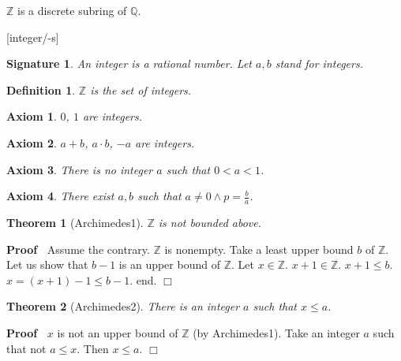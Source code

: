 \documentclass{article}
\newenvironment{forthel}{\begin{leftbar}}{\end{leftbar}}
\newenvironment{proof}{\noindent\textbf{Proof\ }}{\hspace*{\fill}$\Box$\medskip}
\newtheorem{axiom}{Axiom}
\newtheorem{theorem}{Theorem}
\newtheorem{definition}{Definition}
\newtheorem{signature}{Signature}
\newcommand{\QQ}{\mathbb{Q}}
\newcommand{\ZZ}{\mathbb{Z}}
\begin{document}
$\ZZ$ is a discrete subring of $\QQ$.

\begin{forthel}

[integer/-s]

\begin{signature} An \emph{integer} is a rational number.
Let $a,b$ stand for integers.\end{signature}

\begin{definition} $\ZZ$ is the set of integers.\end{definition}


\begin{axiom} $0$, $1$ are integers.
\end{axiom}

\begin{axiom} $a + b$, $a \cdot b$, $-a$ are integers.
\end{axiom}

\begin{axiom} There is no integer $a$ such that $0 < a < 1$.
\end{axiom}

\begin{axiom} There exist $a,b$ such that 
$a \neq 0 \wedge p = \frac{b}{a}$.
\end{axiom}

\begin{theorem}[Archimedes1] $\ZZ$ is not bounded above.
\end{theorem}
\begin{proof} Assume the contrary.
$\ZZ$ is nonempty. Take a least upper bound 
$b$ of $\ZZ$.
Let us show that $b - 1$ is an upper bound of $\ZZ$.
Let $x \in \ZZ$. $x + 1 \in \ZZ$. 
$x + 1 \leq b$.
$x = (x + 1) - 1 \leq b - 1$.
end.
\end{proof}

\begin{theorem}[Archimedes2] There is an integer $a$ 
such that $x \leq a$.\end{theorem}
\begin{proof} $x$ is not an upper bound of $\ZZ$ 
(by Archimedes1).
Take an integer $a$ such that not $a \leq x$.
Then $x \leq a$.
\end{proof}

\end{forthel}
\end{document}
